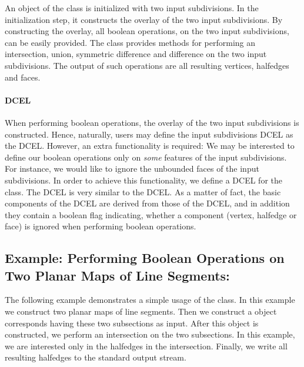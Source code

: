An object of the  class is initialized with 
two input subdivisions. In the initialization step, it constructs the overlay 
of the two input subdivisions. By constructing the overlay, all boolean operations, 
on the two input subdivisions, can be easily provided.
The   class provides methods for 
performing an intersection, union, symmetric difference and difference on the two 
input subdivisions. 
The output of such operations are all resulting vertices, halfedges and faces.

\paragraph{DCEL}
When performing boolean operations, the overlay of the two input subdivisions is 
constructed. Hence, naturally, users may define the input subdivisions DCEL as the 
 DCEL. 
However, an extra functionality is required: We may be interested 
to define our boolean operations only on {\it some} features of the input subdivisions.
For instance, we would like to ignore the unbounded faces of the input subdivisions.
In order to achieve this functionality, we define a DCEL for the 
 class. 
The  DCEL is very similar to 
the  DCEL.
As a matter of fact, the basic components 
of the  DCEL are 
derived from those of the  DCEL, 
and in addition they contain a boolean flag indicating, 
whether a component (vertex, halfedge or face) is ignored 
when performing boolean operations.

\subsection*{Example: Performing Boolean Operations on Two Planar Maps of Line Segments:}
The following example demonstrates a simple usage of the  class.
In this example we construct two planar maps of line segments. 
Then we construct a  object corresponds 
having these two subsections as input. 
After this object is constructed, we perform an intersection on the two subsections. 
In this example, we are interested only in the halfedges in the intersection.
Finally, we write all resulting halfedges to the standard output stream. 

